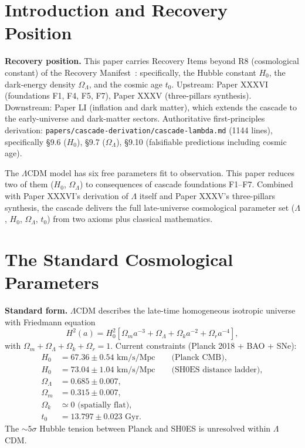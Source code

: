 \documentclass[12pt]{article}
\theoremstyle{definition}
\theoremstyle{remark}
\begin{document}
\section{Introduction and Recovery Position}\label{sec:intro}

\textbf{Recovery position.} This paper carries Recovery Items beyond R8 (cosmological constant) of the Recovery Manifest~\citep{RecoveryManifest}: specifically, the Hubble constant $H_0$, the dark-energy density $\Omega_\Lambda$, and the cosmic age $t_0$. Upstream: Paper XXXVI (foundations F1, F4, F5, F7), Paper XXXV (three-pillars synthesis). Downstream: Paper LI (inflation and dark matter), which extends the cascade to the early-universe and dark-matter sectors. Authoritative first-principles derivation: \texttt{papers/cascade-derivation/cascade-lambda.md} (1144 lines), specifically §9.6 ($H_0$), §9.7 ($\Omega_\Lambda$), §9.10 (falsifiable predictions including cosmic age).

The $\Lambda$CDM model has six free parameters fit to observation. This paper reduces two of them ($H_0$, $\Omega_\Lambda$) to consequences of cascade foundations F1--F7. Combined with Paper XXXVI's derivation of $\Lambda$ itself and Paper XXXV's three-pillars synthesis, the cascade delivers the full late-universe cosmological parameter set ($\Lambda$, $H_0$, $\Omega_\Lambda$, $t_0$) from two axioms plus classical mathematics.

\section{The Standard Cosmological Parameters}\label{sec:standard}

\textbf{Standard form.} $\Lambda$CDM describes the late-time homogeneous isotropic universe with Friedmann equation
\begin{equation}\label{eq:friedmann}
H^2(a) = H_0^2 \left[ \Omega_m a^{-3} + \Omega_\Lambda + \Omega_k a^{-2} + \Omega_r a^{-4} \right],
\end{equation}
with $\Omega_m + \Omega_\Lambda + \Omega_k + \Omega_r = 1$. Current constraints (Planck 2018 + BAO + SNe):
\begin{align}
H_0 &= 67.36 \pm 0.54 \text{ km/s/Mpc} \qquad \text{(Planck CMB)},\\
H_0 &= 73.04 \pm 1.04 \text{ km/s/Mpc} \qquad \text{(SH0ES distance ladder)},\\
\Omega_\Lambda &= 0.685 \pm 0.007,\\
\Omega_m &= 0.315 \pm 0.007,\\
\Omega_k &\simeq 0 \text{ (spatially flat)},\\
t_0 &= 13.797 \pm 0.023 \text{ Gyr}.
\end{align}
The $\sim 5\sigma$ Hubble tension between Planck and SH0ES is unresolved within $\Lambda$CDM.
\end{document}
